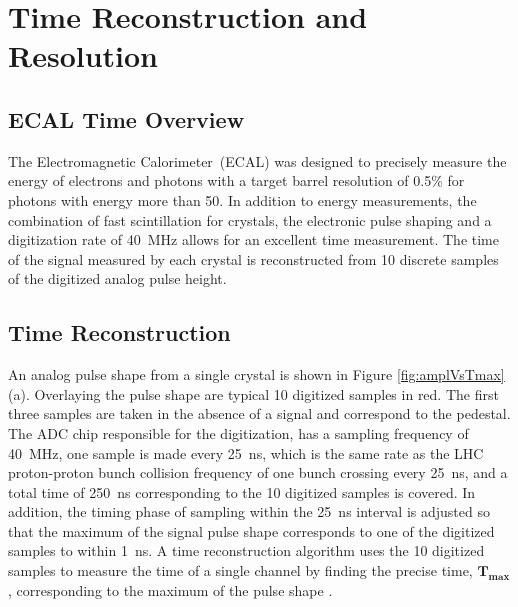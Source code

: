 \chapter{Time Reconstruction and Resolution}
\section*{ECAL Time Overview}
The Electromagnetic Calorimeter~(ECAL) was designed to precisely measure the energy of electrons and photons with a target barrel resolution of 0.5\% for photons with energy more than 50\GeV. In addition to energy measurements, the combination of fast scintillation for \pb crystals, the electronic pulse shaping and a digitization rate of 40~MHz allows for an excellent time measurement.  
The time of the signal measured by each crystal is reconstructed from 10 discrete samples of the digitized analog pulse height\cite{ECALTDR,ECALREADOUT,ECAL}. 
\section{Time Reconstruction}\label{timereco}
An analog pulse shape from a single crystal is shown in Figure \ref{fig:amplVsTmax}(a). 
Overlaying the pulse shape are typical 10 digitized  samples in red. The first three samples are taken in the absence of a signal and correspond to the pedestal.
The ADC chip responsible for the digitization, has a sampling frequency of 40~MHz, \ie one sample is made every 25~ns, which is the same rate as the LHC proton-proton bunch collision frequency of one bunch crossing every 25~ns, and a total time of 250~ns corresponding to the 10 digitized samples is covered.
In addition, the timing phase of sampling within the 25~ns interval is adjusted so that the maximum of the signal pulse shape corresponds to one of the digitized samples to within 1~ns.
A time reconstruction algorithm uses the 10 digitized samples to measure the time of a single channel by finding the precise time, $\mathbf{T_{max}}$, corresponding to the maximum of the pulse shape \cite{RECOAMPLI,TIME}. 

